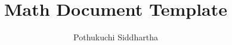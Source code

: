 \documentclass[journal,12pt,twocolumn]{IEEEtran}
\begin{document}
\makeatletter
{}
\makeatother
\let\StandardTheFigure\thefigure
\let\vec\mathbf
\renewcommand{\thefigure}{\theproblem}
\def\putbox#1#2#3{\makebox[0in][l]{\makebox[#1][l]{}\raisebox{\baselineskip}[0in][0in]{\raisebox{#2}[0in][0in]{#3}}}}
     \def\rightbox#1{\makebox[0in][r]{#1}}
     \def\centbox#1{\makebox[0in]{#1}}
     \def\topbox#1{\raisebox{-\baselineskip}[0in][0in]{#1}}
     \def\midbox#1{\raisebox{-0.5\baselineskip}[0in][0in]{#1}}
\vspace{3cm}
\title{Math Document Template}
\author{Pothukuchi Siddhartha}
%
%
%
% 
%
\end{document}
